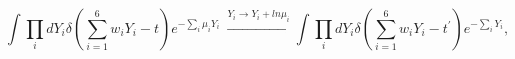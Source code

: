 \begin{equation}
\label{eq:tprimedieuf}
\int\prod_i dY_i\delta(\sum_{i=1}^6w_iY_i - t)e^{-\sum_i\mu_iY_i}\ \stackrel{Y_i\rightarrow Y_i+ln\mu_i}{
\longrightarrow}\int\prod_i dY_i
\delta(\sum_{i=1}^6w_iY_i-t^\prime)e^{-\sum_iY_i},
\end{equation}


